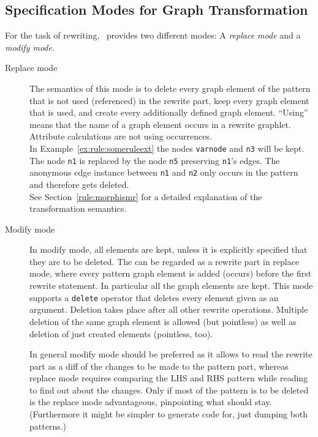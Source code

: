 \subsection{Specification Modes for Graph Transformation}
For the task of rewriting, \GrG\ provides two different modes: A \emph{replace mode} and a \emph{modify mode}.
\begin{description}
  \item[Replace mode]  The semantics of this mode is to delete every graph element of the pattern that is not used (referenced) in the rewrite part, keep every graph element that is used, and create every additionally defined graph element. ``Using'' means that the name of a graph element occurs in a rewrite graphlet. Attribute calculations are not using occurrences.\\
  In Example~\ref{ex:rule:someruleext} the nodes \texttt{varnode} and \texttt{n3} will be kept. The node \texttt{n1} is replaced by the node \texttt{n5} preserving \texttt{n1}'s edges. The anonymous edge instance between \texttt{n1} and \texttt{n2} only occurs in the pattern and therefore gets deleted.\\
See Section~\ref{rule:morphismr} for a detailed explanation of the transformation semantics.
  \item[Modify mode]  In modify mode, all elements are kept, unless it is explicitly specified that they are to be deleted. The  can be regarded as a rewrite part in replace mode, where every pattern graph element is added (occurs) before the first rewrite statement.
In particular all the  graph elements are kept.
This mode supports a \texttt{delete} operator that deletes every element given as an argument.
Deletion takes place after all other rewrite operations. Multiple deletion of the same graph element is allowed (but pointless) as well as deletion of just created elements (pointless, too).

\begin{note}
In general modify mode should be preferred as it allows to read the rewrite part as a diff of the changes to be made to the pattern part, whereas replace mode requires comparing the LHS and RHS pattern while reading to find out about the changes.
Only if most of the pattern is to be deleted is the replace mode advantageous, pinpointing what should stay.
(Furthermore it might be simpler to generate code for, just dumping both patterns.)
\end{note}


\end{description}
